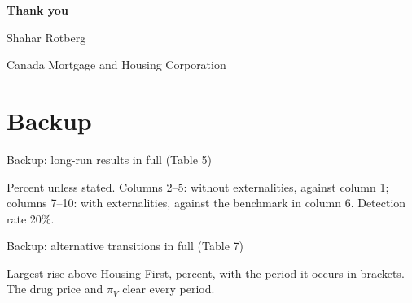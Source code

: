 \documentclass[aspectratio=169,11pt]{beamer}
\newcommand{\HF}{Housing First}
\newcommand{\source}[1]{\par\vfill{\color{lgrey}\tiny #1}}
\begin{document}
{
\begin{frame}
\centering\vfill
{\Large\bfseries\color{dblue}Thank you}\par\vspace{0.4cm}
Shahar Rotberg\par
{\small Canada Mortgage and Housing Corporation}\par
\vfill
\end{frame}}

\appendix
\section*{Backup}

\begin{frame}{Backup: long-run results in full (Table 5)}
\centering
\resizebox{0.86\textwidth}{!}{}
\source{Percent unless stated. Columns 2--5: without externalities, against column 1; columns 7--10: with externalities, against the benchmark in column 6. Detection rate 20\%.}
\end{frame}

\begin{frame}{Backup: alternative transitions in full (Table 7)}
\centering\small
\resizebox{\textwidth}{!}{}
\source{Largest rise above \HF, percent, with the period it occurs in brackets. The drug price and $\pi_V$ clear every period.}
\end{frame}
\end{document}

